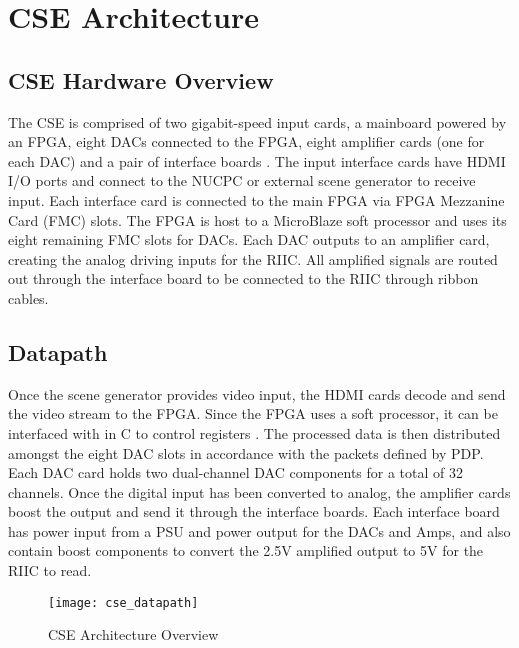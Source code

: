 %
%
\chapter{CSE Architecture}
\section{CSE Hardware Overview}
The CSE is comprised of two gigabit-speed input cards, a mainboard powered by an FPGA, eight DACs connected to the FPGA, eight amplifier cards (one for each DAC) and a pair of interface boards \cite{chris}. The input interface cards have HDMI I/O ports and connect to the NUCPC or external scene generator to receive input. Each interface card is connected to the main FPGA via FPGA Mezzanine Card (FMC) slots. The FPGA is host to a MicroBlaze soft processor and uses its eight remaining FMC slots for DACs. Each DAC outputs to an amplifier card, creating the analog driving inputs for the RIIC. All amplified signals are routed out through the interface board to be connected to the RIIC through ribbon cables. 
\section{Datapath}
Once the scene generator provides video input, the HDMI cards decode and send the video stream to the FPGA. Since the FPGA uses a soft processor, it can be interfaced with in C to control registers \cite{chris}. The processed data is then distributed amongst the eight DAC slots in accordance with the packets defined by PDP. Each DAC card holds two dual-channel DAC components for a total of 32 channels. Once the digital input has been converted to analog, the amplifier cards boost the output and send it through the interface boards. Each interface board has power input from a PSU and power output for the DACs and Amps, and also contain boost components to convert the 2.5V amplified output to 5V for the RIIC to read. \par
\begin{figure}[!htb]
	\texttt{[image: cse\_datapath]}
	\centering
	\caption{CSE Architecture Overview}
	\centering
\end{figure}
